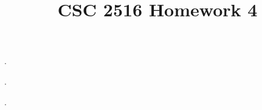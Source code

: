 \documentclass{myhw}
\title{CSC 2516 Homework 4}
\begin{document}
\begin{homeworkProblem}
.
\begin{homeworkSection}
\end{homeworkSection}
\begin{homeworkSection}
\end{homeworkSection}
\begin{homeworkSection}
\end{homeworkSection}
\end{homeworkProblem}


\begin{homeworkProblem}
.
\begin{homeworkSection}
\end{homeworkSection}
\begin{homeworkSection}
\end{homeworkSection}
\begin{homeworkSection}
\end{homeworkSection}
\end{homeworkProblem}


\begin{homeworkProblem}
.
\begin{homeworkSection}
\end{homeworkSection}
\begin{homeworkSection}
\end{homeworkSection}
\begin{homeworkSection}
\end{homeworkSection}
\end{homeworkProblem}
\end{document}
